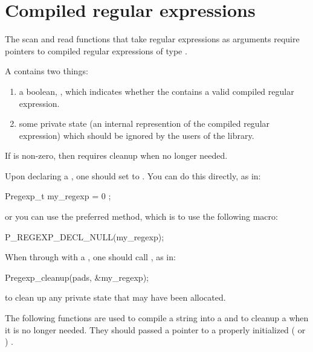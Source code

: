 \section{Compiled regular expressions}
\label{sec:library-use-compiled-regular-expressions}

 The scan and read functions that take regular expressions as arguments
 require pointers to compiled regular expressions of type
 .

 A  contains two things:
\begin{enumerate}
\item a boolean, , which indicates whether the 
       contains a valid compiled regular expression.
\item  some private state (an internal represention of the compiled regular expression)
       which should be ignored by the users of the library.
\end{enumerate}

%
\noindent
If  is non-zero, then  requires cleanup when no longer needed.

Upon declaring a , one should set  to .
You can do this directly, as in:

\begin{centercode}
     Pregexp\_t my\_regexp = { 0 };
\end{centercode}
%
\noindent
or you can use the preferred method, which is to use the following
macro:

\begin{centercode}
    P\_REGEXP\_DECL\_NULL(my\_regexp);
\end{centercode}
%
\noindent
When through with a  , one should call , as in:

\begin{centercode}
    Pregexp\_cleanup(pads, &my\_regexp);
\end{centercode}
%
\noindent
to clean up any private state that may have been allocated.

The following functions are used to compile a string into a 
and to cleanup a  when it is no longer needed.  They should
passed a pointer to a properly initialized ( or ) .

